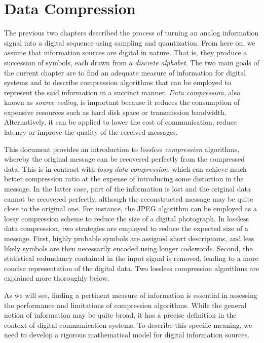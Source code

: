 \chapter{Data Compression}

The previous two chapters described the process of turning an analog information signal into a digital sequence using sampling and quantization.
From here on, we assume that information sources are digital in nature.
That is, they produce a succession of symbols, each drawn from a \emph{discrete alphabet}.
The two main goals of the current chapter are to find an adequate measure of information for digital systems and to describe compression algorithms that can be employed to represent the said information in a succinct manner.
\emph{Data compression}, also known as \emph{source coding}, is important because it reduces the consumption of expensive resources such as hard disk space or transmission bandwidth.
Alternatively, it can be applied to lower the cost of communication, reduce latency or improve the quality of the received messages.

This document provides an introduction to \emph{lossless compression} algorithms, whereby the original message can be recovered perfectly from the compressed data.
This is in contrast with \emph{lossy data compression}, which can achieve much better compression ratio at the expense of introducing some distortion in the message.
In the latter case, part of the information is lost and the original data cannot be recovered perfectly, although the reconstructed message may be quite close to the original one.
For instance, the JPEG algorithm can be employed as a lossy compression scheme to reduce the size of a digital photograph.
In lossless data compression, two strategies are employed to reduce the expected size of a message.
First, highly probable symbols are assigned short descriptions, and less likely symbols are then necessarily encoded using longer codewords.
Second, the statistical redundancy contained in the input signal is removed, leading to a more concise representation of the digital data.
Two lossless compression algorithms are explained more thoroughly below.

As we will see, finding a pertinent measure of information is essential in assessing the performance and limitations of compression algorithms.
While the general notion of information may be quite broad, it has a precise definition in the context of digital communication systems.
To describe this specific meaning, we need to develop a rigorous mathematical model for digital information sources.


